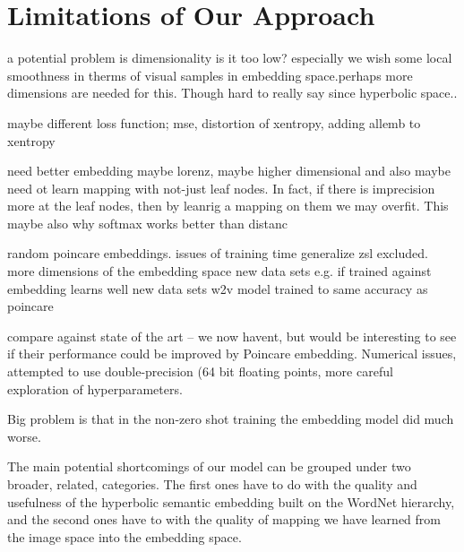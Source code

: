 \documentclass[12pt]{report}
\begin{document}
\section{Limitations of Our Approach}


a potential problem is dimensionality is it too low? especially we wish some local smoothness in therms of visual samples in embedding space.perhaps more dimensions are needed for this. Though hard to really say since hyperbolic space..

maybe different loss function; mse, distortion of xentropy, adding allemb to xentropy

need better embedding maybe lorenz, maybe higher dimensional and also maybe need ot learn mapping with not-just leaf nodes. In fact, if there is imprecision more at the leaf nodes, then by leanrig a mapping on them we may overfit. This maybe also why softmax works better than distanc

random poincare embeddings.
issues of training time
generalize zsl excluded.
more dimensions of the embedding space
new data sets e.g. if trained against embedding learns well new data sets
w2v model trained to same accuracy as poincare  

compare against state of the art -- we now havent, but would be interesting to see if their performance could be improved by Poincare embedding.
Numerical issues, attempted to use double-precision (64 bit floating points, more careful exploration of hyperparameters.












Big problem is that in the non-zero shot training the embedding model did much worse.

The main potential shortcomings of our model can be grouped under two broader, related, categories. The first ones have to do with the quality and usefulness of the hyperbolic semantic embedding built on the WordNet hierarchy, and the second ones have to with the quality of mapping we have learned from the image space into the embedding space.
\end{document}
